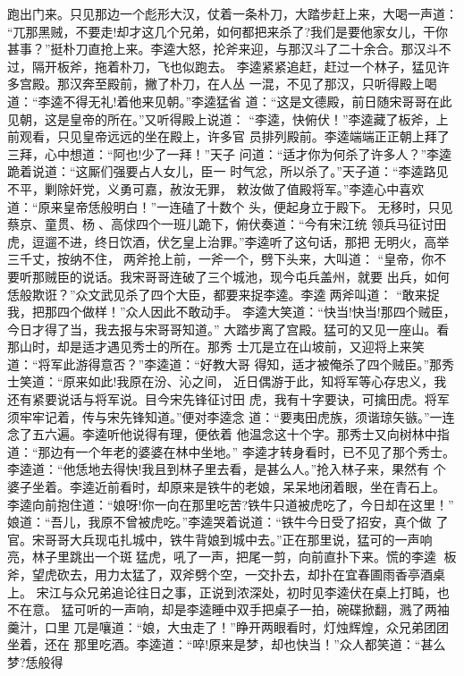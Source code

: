 跑出门来。只见那边一个彪形大汉，仗着一条朴刀，大踏步赶上来，大喝一声道：
“兀那黑贼，不要走!却才这几个兄弟，如何都把来杀了?我们是要他家女儿，干你
甚事？”挺朴刀直抢上来。李逵大怒，抡斧来迎，与那汉斗了二十余合。那汉斗不
过，隔开板斧，拖着朴刀，飞也似跑去。
李逵紧紧追赶，赶过一个林子，猛见许多宫殿。那汉奔至殿前，撇了朴刀，在人丛
一混，不见了那汉，只听得殿上喝道：“李逵不得无礼!着他来见朝。”李逵猛省
道：“这是文德殿，前日随宋哥哥在此见朝，这是皇帝的所在。”又听得殿上说道：
“李逵，快俯伏！”李逵藏了板斧，上前观看，只见皇帝远远的坐在殿上，许多官
员排列殿前。李逵端端正正朝上拜了三拜，心中想道：“阿也!少了一拜！”天子
问道：“适才你为何杀了许多人？”李逵跪着说道：“这厮们强要占人女儿，臣一
时气忿，所以杀了。”天子道：“李逵路见不平，剿除奸党，义勇可嘉，赦汝无罪，
敕汝做了值殿将军。”李逵心中喜欢道：“原来皇帝恁般明白！”一连磕了十数个
头，便起身立于殿下。
无移时，只见蔡京、童贯、杨、高俅四个一班儿跪下，俯伏奏道：“今有宋江统
领兵马征讨田虎，逗遛不进，终日饮酒，伏乞皇上治罪。”李逵听了这句话，那把
无明火，高举三千丈，按纳不住，两斧抢上前，一斧一个，劈下头来，大叫道：
“皇帝，你不要听那贼臣的说话。我宋哥哥连破了三个城池，现今屯兵盖州，就要
出兵，如何恁般欺诳？”众文武见杀了四个大臣，都要来捉李逵。李逵两斧叫道：
“敢来捉我，把那四个做样！”众人因此不敢动手。
李逵大笑道：“快当!快当!那四个贼臣，今日才得了当，我去报与宋哥哥知道。”
大踏步离了宫殿。猛可的又见一座山。看那山时，却是适才遇见秀士的所在。那秀
士兀是立在山坡前，又迎将上来笑道：“将军此游得意否？”李逵道：“好教大哥
得知，适才被俺杀了四个贼臣。”那秀士笑道：“原来如此!我原在汾、沁之间，
近日偶游于此，知将军等心存忠义，我还有紧要说话与将军说。目今宋先锋征讨田
虎，我有十字要诀，可擒田虎。将军须牢牢记着，传与宋先锋知道。”便对李逵念
道：“要夷田虎族，须谐琼矢镞。”一连念了五六遍。李逵听他说得有理，便依着
他温念这十个字。那秀士又向树林中指道：“那边有一个年老的婆婆在林中坐地。”
李逵才转身看时，已不见了那个秀士。
李逵道：“他恁地去得快!我且到林子里去看，是甚么人。”抢入林子来，果然有
个婆子坐着。李逵近前看时，却原来是铁牛的老娘，呆呆地闭着眼，坐在青石上。
李逵向前抱住道：“娘呀!你一向在那里吃苦?铁牛只道被虎吃了，今日却在这里！”
娘道：“吾儿，我原不曾被虎吃。”李逵哭着说道：“铁牛今日受了招安，真个做
了官。宋哥哥大兵现屯扎城中，铁牛背娘到城中去。”正在那里说，猛可的一声响
亮，林子里跳出一个斑猛虎，吼了一声，把尾一剪，向前直扑下来。慌的李逵
板斧，望虎砍去，用力太猛了，双斧劈个空，一交扑去，却扑在宜春圃雨香亭酒桌
上。
宋江与众兄弟追论往日之事，正说到浓深处，初时见李逵伏在桌上打盹，也不在意。
猛可听的一声响，却是李逵睡中双手把桌子一拍，碗碟掀翻，溅了两袖羹汁，口里
兀是嚷道：“娘，大虫走了！”睁开两眼看时，灯烛辉煌，众兄弟团团坐着，还在
那里吃酒。李逵道：“啐!原来是梦，却也快当！”众人都笑道：“甚么梦?恁般得
